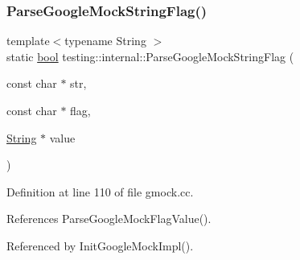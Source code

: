 \subsubsection{\texorpdfstring{Parse\+Google\+Mock\+String\+Flag()}{ParseGoogleMockStringFlag()}}
{\footnotesize\ttfamily template$<$typename String $>$ \\
static \hyperlink{classbool}{bool} testing\+::internal\+::\+Parse\+Google\+Mock\+String\+Flag (\begin{DoxyParamCaption}\item[{const char $\ast$}]{str,  }\item[{const char $\ast$}]{flag,  }\item[{\hyperlink{classtesting_1_1internal_1_1String}{String} $\ast$}]{value }\end{DoxyParamCaption})\hspace{0.3cm}{\ttfamily [static]}}



Definition at line 110 of file gmock.\+cc.



References Parse\+Google\+Mock\+Flag\+Value().



Referenced by Init\+Google\+Mock\+Impl().


